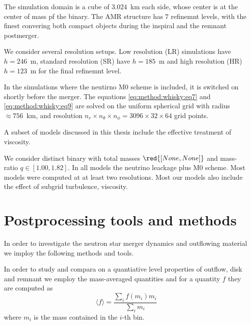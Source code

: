 The simulation domain is a cube of $3.024$~km each side, whose center is at the center of mass pf the binary.
The AMR structure has $7$ refinemnt levels, with the finest convering both compact objects during the inspiral and the remnant postmerger.

We consider several resolution setups. Low resolution (LR) simulations have $h=246$~m, standard resolution (SR) 
have $h=185$~m and high resolution (HR) $h=123$~m for the final refinemnt level.

In the simulations where the neutirno M0 scheme is included, it is switched on shortly before the merger. 
The equations \eqref{eq:method:whisky:eq7} and \eqref{eq:method:whisky:eq9} are solved on the uniform spherical grid
with radius $\approx 756$~km, and resolution $n_r\times n_{\theta}\times n_{\phi} = 3096 \times 32 \times 64$
grid points.

A subset of models discussed in this thesis include the effective treatment of viscosity. 

We consider  distinct binary with total masses $\red{[None,None]}$ and mass-ratio $q\in[1.00,1.82]$.
In all models the neutrino leackage plus M0 scheme. Most models were computed at at least two resolutions. 
Most our models also include the effect of subgrid turbulence, viscosity.







\section{Postprocessing tools and methods}


In order to investigate the neutron star merger dynamics and outflowing material we imploy the following methods and tools.

In order to study and compara on a quantiative level properties of outflow, disk and remnant we employ the mass-averaged quantities and for a quantity $f$ they are computed as 
\begin{equation}
\langle f \rangle = \frac{\sum_i f(m_i)m_i}{\sum_i m_i}
\end{equation}
where $m_i$ is the mass contained in the $i$-th bin.


